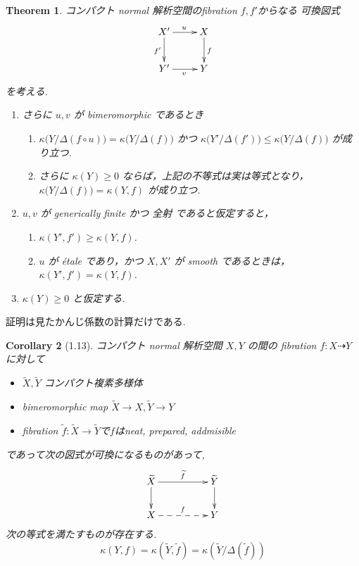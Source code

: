 \documentclass[dvipdfmx,a4paper,11pt]{article} %
\newtheorem{thm}{Theorem}[section]
\newtheorem{cor}[thm]{Corollary}
\theoremstyle{definition}
\theoremstyle{remark}
\numberwithin{equation}{section}
\begin{document}
\begin{thm}\cite[Theorem 1.8, 1.14]{Cam04}
\label{thm-Cam04-1.8}
コンパクト normal 解析空間のfibration $f, f'$からなる
可換図式
\[
\xymatrix{
X' \ar[d]_{f'} \ar[r]^{u} & X \ar[d]^{f} \\
Y' \ar[r]_{v} & Y
}
\]
を考える.

\begin{enumerate}
\item さらに \(u,v\) が bimeromorphic であるとき
  \begin{enumerate}
  \item \(\kappa\bigl(Y/\Delta(f \circ u)\bigr) = \kappa\bigl(Y/\Delta(f)\bigr)\) かつ
        \(\kappa\bigl(Y'/\Delta(f')\bigr) \le \kappa\bigl(Y/\Delta(f)\bigr)\) が成り立つ.
  \item さらに \(\kappa(Y) \ge 0\) ならば，上記の不等式は実は等式となり，
        \(\kappa\bigl(Y/\Delta(f)\bigr) = \kappa(Y,f)\) が成り立つ.
  \end{enumerate}
\item \(u,v\) が generically finite かつ 全射 であると仮定すると，
  \begin{enumerate}
  \item \(\kappa(Y',f') \ge \kappa(Y,f)\).
  \item \(u\) が étale であり，かつ \(X,X'\) が smooth であるときは，
        \(\kappa(Y',f') = \kappa(Y,f)\).
  \end{enumerate}
  \item \(\kappa(Y) \ge 0\) と仮定する.
\end{enumerate}
\end{thm}
証明は見たかんじ係数の計算だけである. 

\begin{cor}[1.13]
コンパクト normal 解析空間 \(X, Y\) の間の
fibration \(f : X \dashrightarrow Y\) に対して
\begin{itemize}
\item $\widetilde{X}, \widetilde{Y}$ コンパクト複素多様体
\item bimeromorphic map $\widetilde{X} \to X, \widetilde{Y} \to Y$
\item fibration $\widetilde{f} : \widetilde{X} \to \widetilde{Y}$で$f$はneat, prepared, addmisible
\end{itemize}
であって次の図式が可換になるものがあって, 
  \[
\xymatrix@C=50pt@R=20pt{
\widetilde{X}  \ar@{->}[d]\ar@{->}[r]^{\widetilde{f}} &\widetilde{Y} \ar@{->}[d]\\
 X\ar@{-->}[r]^{f} & Y\\
}
\]
次の等式を満たすものが存在する.
$$
\kappa(Y, f) = \kappa(\widetilde{Y}, \widetilde{f}) = \kappa(\widetilde{Y}/\Delta(\widetilde{f}))
$$

\end{cor}
\end{document}

